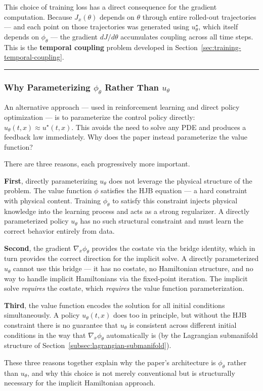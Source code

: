 \documentclass{article}
\begin{document}
This choice of training loss has a direct consequence for the gradient
computation. Because $J_x(\theta)$ depends on $\theta$ through entire
rolled-out trajectories --- and each point on those trajectories was generated
using $u^\star_\theta$, which itself depends on $\phi_\theta$ --- the gradient
$dJ/d\theta$ accumulates coupling across all time steps. This is the
\textbf{temporal coupling} problem developed in
Section~\ref{sec:training-temporal-coupling}.

\medskip\hrule\medskip

\subsubsection{Why Parameterizing $\phi_\theta$ Rather Than $u_\theta$}

\begin{extrainfobox}
An alternative approach --- used in reinforcement learning and direct policy
optimization --- is to parameterize the control policy directly:
$u_\theta(t,x) \approx u^\star(t,x)$. This avoids the need to solve any PDE
and produces a feedback law immediately. Why does the paper instead parameterize
the value function?

There are three reasons, each progressively more important.

\textbf{First}, directly parameterizing $u_\theta$ does not leverage the
physical structure of the problem. The value function $\phi$ satisfies the HJB
equation --- a hard constraint with physical content. Training $\phi_\theta$ to
satisfy this constraint injects physical knowledge into the learning process and
acts as a strong regularizer. A directly parameterized policy $u_\theta$ has no
such structural constraint and must learn the correct behavior entirely from
data.

\textbf{Second}, the gradient $\nabla_x\phi_\theta$ provides the costate via
the bridge identity, which in turn provides the correct direction for the
implicit solve. A directly parameterized $u_\theta$ cannot use this bridge ---
it has no costate, no Hamiltonian structure, and no way to handle implicit
Hamiltonians via the fixed-point iteration. The implicit solve \textit{requires} the
costate, which \textit{requires} the value function parameterization.

\textbf{Third}, the value function encodes the solution for all initial
conditions simultaneously. A policy $u_\theta(t,x)$ does too in principle, but
without the HJB constraint there is no guarantee that $u_\theta$ is consistent
across different initial conditions in the way that $\nabla_x\phi_\theta$
automatically is (by the Lagrangian submanifold structure of Section~\ref{subsec:lagrangian-submanifold}).

These three reasons together explain why the paper's architecture is
$\phi_\theta$ rather than $u_\theta$, and why this choice is not merely
conventional but is structurally necessary for the implicit Hamiltonian approach.
\end{extrainfobox}
\end{document}
